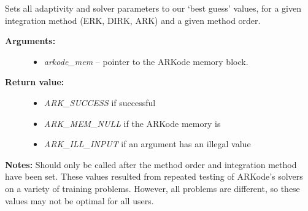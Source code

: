 \documentclass[letterpaper,10pt,english]{sphinxmanual}
\begin{document}
\begin{fulllineitems}
\label{c_interface/User_callable:c.ARKodeSetOptimalParams}
Sets all adaptivity and solver parameters to our `best
guess' values, for a given integration method (ERK, DIRK, ARK) and
a given method order.
\begin{description}
\item[{\textbf{Arguments:}}] \leavevmode\begin{itemize}
\item {} 
\emph{arkode\_mem} -- pointer to the ARKode memory block.

\end{itemize}

\item[{\textbf{Return value:}}] \leavevmode\begin{itemize}
\item {} 
\emph{ARK\_SUCCESS} if successful

\item {} 
\emph{ARK\_MEM\_NULL} if the ARKode memory is 

\item {} 
\emph{ARK\_ILL\_INPUT} if an argument has an illegal value

\end{itemize}

\end{description}

\textbf{Notes:} Should only be called after the method order and integration
method have been set.  These values resulted from repeated testing
of ARKode's solvers on a variety of training problems.  However,
all problems are different, so these values may not be optimal for
all users.

\end{fulllineitems}

\end{document}
